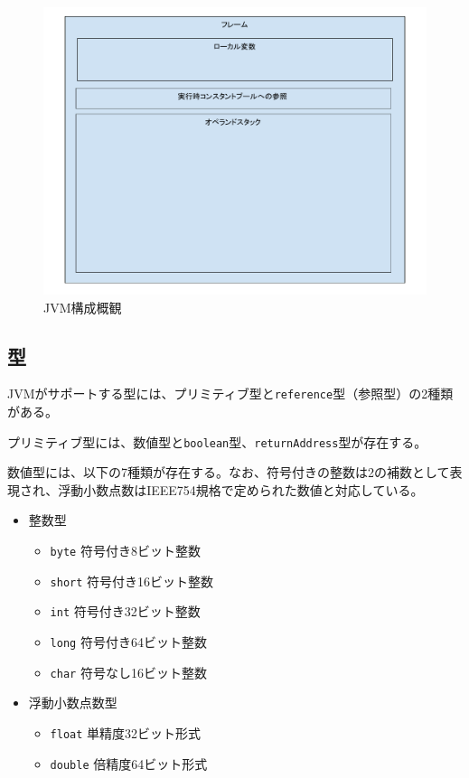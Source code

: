 \begin{figure}[htbp]
  \caption{JVM構成概観}
  \label{fig:jvm_frame}
  \begin{center}
    \includegraphics[bb=0 0 800 600,width=12cm]{img/jvm_frame.pdf}
  \end{center}
\end{figure}

\subsection{型}

JVMがサポートする型には、プリミティブ型と\verb|reference|型（参照型）の2種類がある。

プリミティブ型には、数値型と\verb|boolean|型、\verb|returnAddress|型が存在する。

数値型には、以下の7種類が存在する。なお、符号付きの整数は2の補数として表現され、浮動小数点数はIEEE754規格\cite{ieee754}で定められた数値と対応している。
\begin{itemize}
  \item 整数型
  \begin{itemize}
    \item \verb|byte| 符号付き8ビット整数
    \item \verb|short| 符号付き16ビット整数
    \item \verb|int| 符号付き32ビット整数
    \item \verb|long| 符号付き64ビット整数
    \item \verb|char| 符号なし16ビット整数
  \end{itemize}
  \item 浮動小数点数型
  \begin{itemize}
    \item \verb|float| 単精度32ビット形式
    \item \verb|double| 倍精度64ビット形式
  \end{itemize}
\end{itemize}


